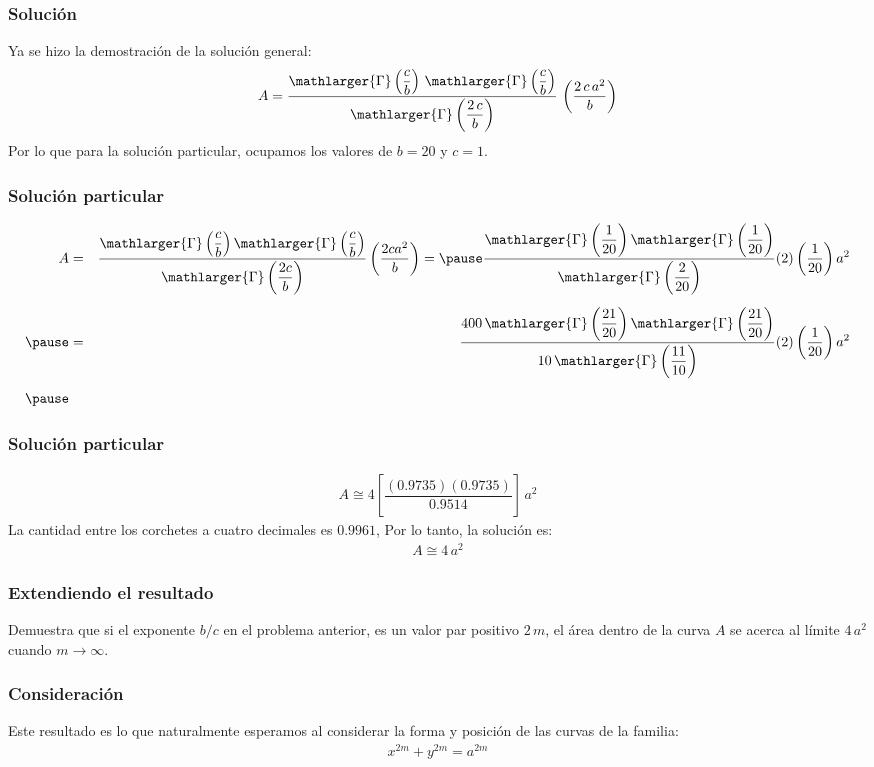 \documentclass[12pt]{beamer}
\begin{document}
\begin{frame}
\frametitle{Solución}
Ya se hizo la demostración de la solución general:
\begin{align*}
A = \dfrac{\mathlarger{\Gamma} \left( \dfrac{c}{b} \right) \, \mathlarger{\Gamma} \left( \dfrac{c}{b} \right)}{\mathlarger{\Gamma} \left( \dfrac{2 \, c}{b} \right)} \, \left( \dfrac{2 \, c \, a^{2}}{b} \right)
\end{align*}
Por lo que para la solución particular, ocupamos los valores de $b = 20$ y $c = 1$.
\end{frame}
\begin{frame}
\frametitle{Solución particular}
\begin{eqnarray*}
A &=& \dfrac{\mathlarger{\Gamma} \left( \dfrac{c}{b} \right) \mathlarger{\Gamma} \left( \dfrac{c}{b} \right)}{\mathlarger{\Gamma} \left( \dfrac{2 c}{b} \right)} \left( \dfrac{2 c a^{2}}{b} \right) = \pause \dfrac{\mathlarger{\Gamma} \left( \dfrac{1}{20} \right) \mathlarger{\Gamma} \left( \dfrac{1}{20} \right)}{\mathlarger{\Gamma} \left( \dfrac{2}{20} \right)} (2) \left( \dfrac{1}{20} \right) a^{2} \\[0.5em] \pause
&=& \dfrac{400 \, \mathlarger{\Gamma} \left( \dfrac{21}{20} \right) \mathlarger{\Gamma} \left( \dfrac{21}{20} \right)}{10 \, \mathlarger{\Gamma} \left( \dfrac{11}{10} \right)} (2) \left( \dfrac{1}{20} \right) a^{2} \\[0.5em] \pause
\end{eqnarray*}  
\end{frame}
\begin{frame}
\frametitle{Solución particular}
\begin{align*}
A \cong 4 \left[ \dfrac{(0.9735)(0.9735)}{0.9514} \right] \, a^{2}
\end{align*}  
\pause
La cantidad entre los corchetes a cuatro decimales es $0.9961$, Por lo tanto, la solución es:
\begin{align*}
A \cong 4 \, a^{2}
\end{align*}
\end{frame}
\begin{frame}
\frametitle{Extendiendo el resultado}
Demuestra que si el exponente $b/c$ en el problema anterior, es un valor par positivo $2 \, m$, el área dentro de la curva $A$ se acerca al límite $4 \, a^{2}$ cuando $m \to \infty$.
\end{frame}
\begin{frame}
\frametitle{Consideración}
Este resultado es lo que naturalmente esperamos al considerar la forma y posición de las curvas de la familia:
\begin{align*}
x^{2m} + y^{2m} = a^{2m}
\end{align*}
\end{frame}
\end{document}
